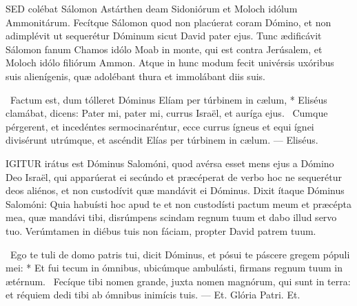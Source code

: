 
\lettrine[lines=2]{S}{ED} colébat Sálomon Astárthen deam Sidoniórum et Moloch idólum Ammonitárum. Fecítque Sálomon quod non placúerat coram Dómino, et non adimplévit ut sequerétur Dóminum sicut David pater ejus. Tunc ædificávit Sálomon fanum Chamos idólo Moab in monte, qui est contra Jerúsalem, et Moloch idólo filiórum Ammon. Atque in hunc modum fecit univérsis uxóribus suis alienígenis, quæ adolébant thura et immolábant diis suis.

\R\ Factum est, dum tólleret Dóminus Elíam per túrbinem in cælum, * Eliséus clamábat, dicens: Pater mi, pater mi, currus Israël, et auríga ejus. \V\ Cumque pérgerent, et incedéntes sermocinaréntur, ecce currus ígneus et equi ígnei divisérunt utrúmque, et ascéndit Elías per túrbinem in cælum. --- Eliséus.



\lettrine[lines=2]{I}{GITUR} irátus est Dóminus Salomóni, quod avérsa esset mens ejus a Dómino Deo Israël, qui apparúerat ei secúndo et præcéperat de verbo hoc ne sequerétur deos aliénos, et non custodívit quæ mandávit ei Dóminus. Dixit ítaque Dóminus Salomóni: Quia habuísti hoc apud te et non custodísti pactum meum et præcépta mea, quæ mandávi tibi, disrúmpens scindam regnum tuum et dabo illud servo tuo. Verúmtamen in diébus tuis non fáciam, propter David patrem tuum.

\R\ Ego te tuli de domo patris tui, dicit Dóminus, et pósui te páscere gregem pópuli mei: * Et fui tecum in ómnibus, ubicúmque ambulásti, firmans regnum tuum in ætérnum. \V\ Fecíque tibi nomen grande, juxta nomen magnórum, qui sunt in terra: et réquiem dedi tibi ab ómnibus inimícis tuis. --- Et. Glória Patri. Et.

